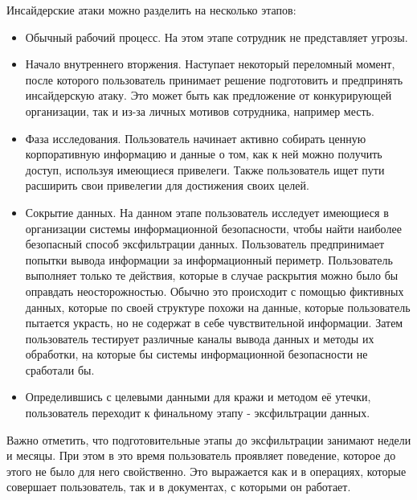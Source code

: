 Инсайдерские атаки можно разделить на несколько этапов:

\begin{itemize}
	\item Обычный рабочий процесс. На этом этапе сотрудник не представляет угрозы.\\
	\item Начало внутреннего вторжения. Наступает некоторый переломный момент, после которого пользователь принимает решение подготовить и предпринять инсайдерскую атаку. Это может быть как предложение от конкурирующей организации, так и из-за личных мотивов сотрудника, например месть.\\
	\item Фаза исследования. Пользователь начинает активно собирать ценную корпоративную информацию и данные о том, как к ней можно получить доступ, используя имеющиеся привелеги. Также пользователь ищет пути расширить свои привелегии для достижения своих целей.\\
	\item Сокрытие данных. На данном этапе пользователь исследует имеющиеся в организации системы информационной безопасности, чтобы найти наиболее безопасный способ эксфильтрации данных. Пользователь предпринимает попытки вывода информации за информационный периметр. Пользователь выполняет только те действия, которые в случае раскрытия можно было бы оправдать неосторожностью. Обычно это происходит с помощью фиктивных данных, которые по своей структуре похожи на данные, которые пользователь пытается украсть, но не содержат в себе чувствительной информации. Затем пользователь тестирует различные каналы вывода данных и методы их обработки, на которые бы системы информационной безопасности не сработали бы.\\
	\item Определившись с целевыми данными для кражи и методом её утечки, пользователь переходит к финальному этапу - эксфильтрации данных. \\
\end{itemize}

Важно отметить, что подготовительные этапы до эксфильтрации занимают недели и месяцы. При этом в это время пользователь проявляет поведение, которое до этого не было для него свойственно. Это выражается как и в операциях, которые совершает пользователь, так и в документах, с которыми он работает.\\

